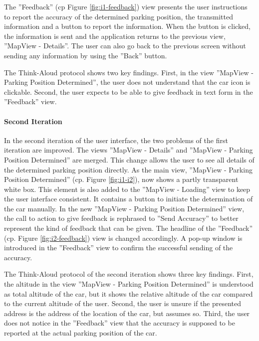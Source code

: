 The ''Feedback'' (cp Figure \ref{fig:i1-feedback}) view presents the user instructions to report the accuracy of the determined parking position, the transmitted information and a button to report the information. When the button is clicked, the information is sent and the application returns to the previous view, ''MapView - Details''. The user can also go back to the previous screen without sending any information by using the ''Back'' button.


The Think-Aloud protocol shows two key findings. First, in the view ''MapView - Parking Position Determined'', the user does not understand that the car icon is clickable. Second, the user expects to be able to give feedback in text form in the ''Feedback'' view.

\paragraph{Second Iteration}

In the second iteration of the user interface, the two problems of the first iteration are improved. The views ''MapView - Details'' and ''MapView - Parking Position Determined'' are merged. This change allows the user to see all details of the determined parking position directly. As the main view, ''MapView - Parking Position Determined'' (cp. Figure \ref{fig:i1-i2}), now shows a partly transparent white box. This element is also added to the ''MapView - Loading'' view to keep the user interface consistent. It contains a button to initiate the determination of the car manually. 
In the new ''MapView - Parking Position Determined'' view, the call to action to give feedback is rephrased to ''Send Accuracy'' to better represent the kind of feedback that can be given. The headline of the ''Feedback'' (cp. Figure \ref{fig:i2-feedback}) view is changed accordingly. A pop-up window is introduced in the ''Feedback'' view to confirm the successful sending of the accuracy.

The Think-Aloud protocol of the second iteration shows three key findings. First, the altitude in the view ''MapView - Parking Position Determined'' is understood as total altitude of the car, but it shows the relative altitude of the car compared to the current altitude of the user. Second, the user is unsure if the presented address is the address of the location of the car, but assumes so. Third, the user does not notice in the ''Feedback'' view that the accuracy is supposed to be reported at the actual parking position of the car.


